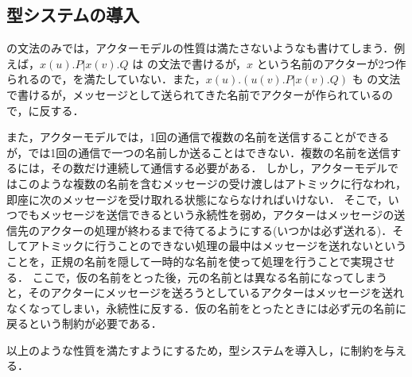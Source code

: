\subsection{型システムの導入}

\api の文法のみでは，アクターモデルの性質は満たさないような\conf も書けてしまう．例えば，$x(u).P | x(v).Q$ は \api の文法で書けるが，$x$ という名前のアクターが2つ作られるので，\unique を満たしていない．また，$x(u).(u(v).P | x(v).Q)$ も \api の文法で書けるが，メッセージとして送られてきた名前でアクターが作られているので，\fresh に反する．

また，アクターモデルでは，1回の通信で複数の名前を送信することができるが，\api では1回の通信で一つの名前しか送ることはできない．複数の名前を送信するには，その数だけ連続して通信する必要がある．
しかし，アクターモデルではこのような複数の名前を含むメッセージの受け渡しはアトミックに行なわれ，即座に次のメッセージを受け取れる状態にならなければいけない．
そこで，いつでもメッセージを送信できるという永続性を弱め，アクターはメッセージの送信先のアクターの処理が終わるまで待てるようにする(いつかは必ず送れる)．そしてアトミックに行うことのできない処理の最中はメッセージを送れないということを，正規の名前を隠して一時的な名前を使って処理を行うことで実現させる．
ここで，仮の名前をとった後，元の名前とは異なる名前になってしまうと，そのアクターにメッセージを送ろうとしているアクターはメッセージを送れなくなってしまい，永続性に反する．仮の名前をとったときには必ず元の名前に戻るという制約が必要である．

以上のような性質を満たすようにするため，型システムを導入し，\api に制約を与える．







